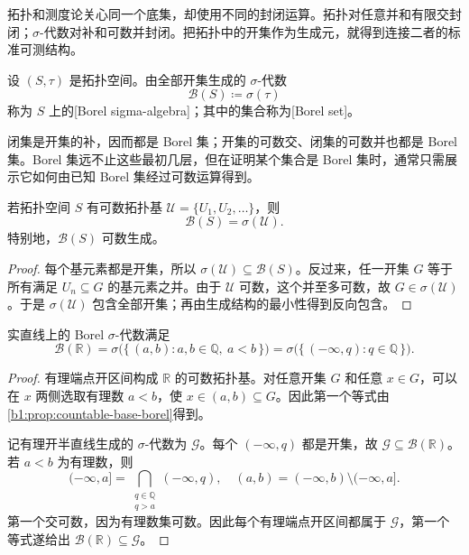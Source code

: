 拓扑和测度论关心同一个底集，却使用不同的封闭运算。拓扑对任意并和有限交封闭；\(\sigma\)-代数对补和可数并封闭。把拓扑中的开集作为生成元，就得到连接二者的标准可测结构。

\begin{definition}
\label{b1:def:borel-sigma}
设 \((S,\tau)\) 是拓扑空间。由全部开集生成的 \(\sigma\)-代数
\[
\mathcal B(S)\coloneqq\sigma(\tau)
\]
称为 \(S\) 上的[Borel sigma-algebra]；其中的集合称为[Borel set]。
\end{definition}

闭集是开集的补，因而都是 Borel 集；开集的可数交、闭集的可数并也都是 Borel 集。Borel 集远不止这些最初几层，但在证明某个集合是 Borel 集时，通常只需展示它如何由已知 Borel 集经过可数运算得到。

\begin{proposition}
\label{b1:prop:countable-base-borel}
若拓扑空间 \(S\) 有可数拓扑基 \(\mathcal U=\{U_1,U_2,\ldots\}\)，则
\[
\mathcal B(S)=\sigma(\mathcal U).
\]
特别地，\(\mathcal B(S)\) 可数生成。
\end{proposition}
\begin{proof}
每个基元素都是开集，所以 \(\sigma(\mathcal U)\subseteq\mathcal B(S)\)。反过来，任一开集 \(G\) 等于所有满足 \(U_n\subseteq G\) 的基元素之并。由于 \(\mathcal U\) 可数，这个并至多可数，故 \(G\in\sigma(\mathcal U)\)。于是 \(\sigma(\mathcal U)\) 包含全部开集；再由生成结构的最小性得到反向包含。
\end{proof}

\begin{theorem}
\label{b1:thm:borel-rational-base}
实直线上的 Borel \(\sigma\)-代数满足
\[
\mathcal B(\mathbb R)
=\sigma\bigl(\{\,(a,b):a,b\in\mathbb Q,\ a<b\,\}\bigr)
=\sigma\bigl(\{\,(-\infty,q):q\in\mathbb Q\,\}\bigr).
\]
\end{theorem}
\begin{proof}
有理端点开区间构成 \(\mathbb R\) 的可数拓扑基。对任意开集 \(G\) 和任意 \(x\in G\)，可以在 \(x\) 两侧选取有理数 \(a<b\)，使 \(x\in(a,b)\subseteq G\)。因此第一个等式由\cref{b1:prop:countable-base-borel}得到。

记有理开半直线生成的 \(\sigma\)-代数为 \(\mathcal G\)。每个 \(( -\infty,q)\) 都是开集，故 \(\mathcal G\subseteq\mathcal B(\mathbb R)\)。若 \(a<b\) 为有理数，则
\[
(-\infty,a]
=\bigcap_{\substack{q\in\mathbb Q\\q>a}}(-\infty,q),
\quad
(a,b)=(-\infty,b)\setminus(-\infty,a].
\]
第一个交可数，因为有理数集可数。因此每个有理端点开区间都属于 \(\mathcal G\)，第一个等式遂给出 \(\mathcal B(\mathbb R)\subseteq\mathcal G\)。
\end{proof}

